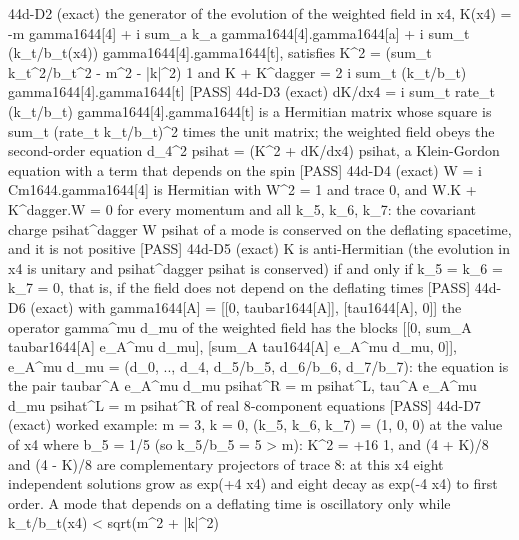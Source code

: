 \documentclass[
  10pt,
]{article}
\newenvironment{Shaded}{}{}
\newcommand{\NormalTok}[1]{#1}
\begin{document}
\begin{Shaded}
\begin{Highlighting}[]
\NormalTok{[PASS] 44d{-}D2  (exact) the generator of the evolution of the weighted field in x4, K(x4) = {-}m gamma1644[4] + i sum\_a k\_a gamma1644[4].gamma1644[a] + i sum\_t (k\_t/b\_t(x4)) gamma1644[4].gamma1644[t], satisfies K\^{}2 = (sum\_t k\_t\^{}2/b\_t\^{}2 {-} m\^{}2 {-} |k|\^{}2) 1 and K + K\^{}dagger = 2 i sum\_t (k\_t/b\_t) gamma1644[4].gamma1644[t]}
\NormalTok{[PASS] 44d{-}D3  (exact) dK/dx4 = i sum\_t rate\_t (k\_t/b\_t) gamma1644[4].gamma1644[t] is a Hermitian matrix whose square is sum\_t (rate\_t k\_t/b\_t)\^{}2 times the unit matrix; the weighted field obeys the second{-}order equation d\_4\^{}2 psihat = (K\^{}2 + dK/dx4) psihat, a Klein{-}Gordon equation with a term that depends on the spin}
\NormalTok{[PASS] 44d{-}D4  (exact) W = i Cm1644.gamma1644[4] is Hermitian with W\^{}2 = 1 and trace 0, and W.K + K\^{}dagger.W = 0 for every momentum and all k\_5, k\_6, k\_7: the covariant charge psihat\^{}dagger W psihat of a mode is conserved on the deflating spacetime, and it is not positive}
\NormalTok{[PASS] 44d{-}D5  (exact) K is anti{-}Hermitian (the evolution in x4 is unitary and psihat\^{}dagger psihat is conserved) if and only if k\_5 = k\_6 = k\_7 = 0, that is, if the field does not depend on the deflating times}
\NormalTok{[PASS] 44d{-}D6  (exact) with gamma1644[A] = [[0, taubar1644[A]], [tau1644[A], 0]] the operator gamma\^{}mu d\_mu of the weighted field has the blocks [[0, sum\_A taubar1644[A] e\_A\^{}mu d\_mu], [sum\_A tau1644[A] e\_A\^{}mu d\_mu, 0]], e\_A\^{}mu d\_mu = (d\_0, .., d\_4, d\_5/b\_5, d\_6/b\_6, d\_7/b\_7): the equation is the pair taubar\^{}A e\_A\^{}mu d\_mu psihat\^{}R = m psihat\^{}L, tau\^{}A e\_A\^{}mu d\_mu psihat\^{}L = m psihat\^{}R of real 8{-}component equations}
\NormalTok{[PASS] 44d{-}D7  (exact) worked example: m = 3, k = 0, (k\_5, k\_6, k\_7) = (1, 0, 0) at the value of x4 where b\_5 = 1/5 (so k\_5/b\_5 = 5 \textgreater{} m): K\^{}2 = +16 1, and (4 + K)/8 and (4 {-} K)/8 are complementary projectors of trace 8: at this x4 eight independent solutions grow as exp(+4 x4) and eight decay as exp({-}4 x4) to first order. A mode that depends on a deflating time is oscillatory only while k\_t/b\_t(x4) \textless{} sqrt(m\^{}2 + |k|\^{}2)}

\end{Highlighting}
\end{Shaded}
\end{document}

